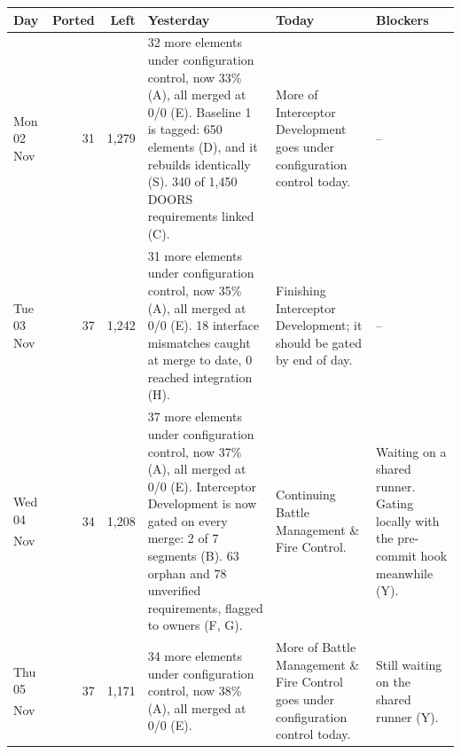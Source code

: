 \documentclass[12pt,letterpaper,oneside]{article}
\newcommand{\blk}{\textsuperscript{\dag}}
\newcommand{\figfont}{\fontsize{9}{11}\selectfont}   %
\begin{document}
\begin{center}
\end{center}
{\figfont\setlength{\tabcolsep}{4pt}\renewcommand{\arraystretch}{1.15}
\begin{longtable}{@{}>{\raggedright}p{} r r >{\raggedright}p{} >{\raggedright}p{} >{\raggedright\arraybackslash}p{}@{}}
\toprule
Day & Ported & Left & Yesterday & Today & Blockers \\
\midrule
\endhead
\bottomrule
\endfoot
Mon 02 Nov & 31 & 1,279 & 32 more elements under configuration control, now 33\% (A), all merged at 0/0 (E). Baseline 1 is tagged: 650 elements (D), and it rebuilds identically (S). 340 of 1,450 DOORS requirements linked (C). & More of Interceptor Development goes under configuration control today. & -- \\
Tue 03 Nov & 37 & 1,242 & 31 more elements under configuration control, now 35\% (A), all merged at 0/0 (E). 18 interface mismatches caught at merge to date, 0 reached integration (H). & Finishing Interceptor Development; it should be gated by end of day. & -- \\
Wed 04 Nov\blk & 34 & 1,208 & 37 more elements under configuration control, now 37\% (A), all merged at 0/0 (E). Interceptor Development is now gated on every merge: 2 of 7 segments (B). 63 orphan and 78 unverified requirements, flagged to owners (F, G). & Continuing Battle Management \& Fire Control. & Waiting on a shared runner. Gating locally with the pre-commit hook meanwhile (Y). \\
Thu 05 Nov\blk & 37 & 1,171 & 34 more elements under configuration control, now 38\% (A), all merged at 0/0 (E). & More of Battle Management \& Fire Control goes under configuration control today. & Still waiting on the shared runner (Y). \\

\end{longtable}}
\end{document}
